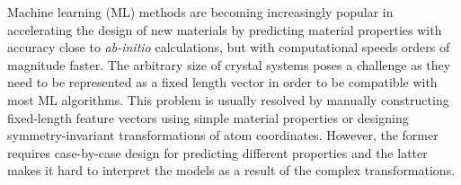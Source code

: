 \documentclass[twocolumn, prl]{revtex4-1}
\begin{document}
\pacs{}

\maketitle



Machine learning (ML) methods are becoming increasingly popular in accelerating the design of new materials by predicting material properties with accuracy close to \textit{ab-initio} calculations, but with computational speeds orders of magnitude faster\cite{seko2015prediction, faber2016machine, xue2016accelerated}. The arbitrary size of crystal systems poses a challenge as they need to be represented as a fixed length vector in order to be compatible with most ML algorithms. This problem is usually resolved by manually constructing fixed-length feature vectors using simple material properties\cite{isayev2017universal, seko2015prediction, xue2016accelerated, ghiringhelli2015big, isayev2015materials} or designing symmetry-invariant transformations of atom coordinates\cite{schutt2014represent, faber2015crystal, seko2017representation}. However, the former requires case-by-case design for predicting different properties and the latter makes it hard to interpret the models as a result of the complex transformations.
\end{document}
